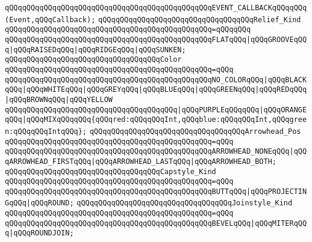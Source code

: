\verb|qQQqqQQqqQQqqQQqqQQqqQQqqQQqqQQqqQQqqQQqqQQqqQQqEVENT_CALLBACKqQQqqQQq(Event,qQQqCallback);|\newline
\newline
\verb|qQQqqQQqqQQqqQQqqQQqqQQqqQQqqQQqqQQqRelief_Kind|\newline
\verb|qQQqqQQqqQQqqQQqqQQqqQQqqQQqqQQqqQQqqQQqqQQqqQQq=qQQqqQQq|\newline
\verb|qQQqqQQqqQQqqQQqqQQqqQQqqQQqqQQqqQQqqQQqqQQqqQQqFLATqQQq|\verb#|qQQqGROOVEqQQq|qQQqRAISEDqQQq|qQQqRIDGEqQQq|qQQqSUNKEN;#\newline
\newline
\verb|qQQqqQQqqQQqqQQqqQQqqQQqqQQqqQQqqQQqColor|\newline
\verb|qQQqqQQqqQQqqQQqqQQqqQQqqQQqqQQqqQQqqQQqqQQqqQQq=qQQq|\newline
\verb|qQQqqQQqqQQqqQQqqQQqqQQqqQQqqQQqqQQqqQQqqQQqqQQqNO_COLORqQQq|\verb#|qQQqBLACKqQQq|qQQqWHITEqQQq|qQQqGREYqQQq|qQQqBLUEqQQq|qQQqGREENqQQq|qQQqREDqQQq|qQQqBROWNqQQq|qQQqYELLOW#\newline
\verb|qQQqqQQqqQQqqQQqqQQqqQQqqQQqqQQqqQQqqQQq|\verb#|qQQqPURPLEqQQqqQQq|qQQqORANGEqQQq|qQQqMIXqQQqqQQq{qQQqred:qQQqqQQqInt,qQQqblue:qQQqqQQqInt,qQQqgreen:qQQqqQQqIntqQQq};#\newline
\newline
\verb|qQQqqQQqqQQqqQQqqQQqqQQqqQQqqQQqqQQqArrowhead_Pos|\newline
\verb|qQQqqQQqqQQqqQQqqQQqqQQqqQQqqQQqqQQqqQQqqQQqqQQq=qQQq|\newline
\verb|qQQqqQQqqQQqqQQqqQQqqQQqqQQqqQQqqQQqqQQqqQQqqQQqARROWHEAD_NONEqQQq|\verb#|qQQqARROWHEAD_FIRSTqQQq|qQQqARROWHEAD_LASTqQQq|qQQqARROWHEAD_BOTH;#\newline
\newline
\verb|qQQqqQQqqQQqqQQqqQQqqQQqqQQqqQQqqQQqCapstyle_Kind|\newline
\verb|qQQqqQQqqQQqqQQqqQQqqQQqqQQqqQQqqQQqqQQqqQQqqQQq=qQQq|\newline
\verb|qQQqqQQqqQQqqQQqqQQqqQQqqQQqqQQqqQQqqQQqqQQqqQQqBUTTqQQq|\verb#|qQQqPROJECTINGqQQq|qQQqROUND;#\newline
\newline
\verb|qQQqqQQqqQQqqQQqqQQqqQQqqQQqqQQqqQQqJoinstyle_Kind|\newline
\verb|qQQqqQQqqQQqqQQqqQQqqQQqqQQqqQQqqQQqqQQqqQQqqQQq=qQQq|\newline
\verb|qQQqqQQqqQQqqQQqqQQqqQQqqQQqqQQqqQQqqQQqqQQqqQQqBEVELqQQq|\verb#|qQQqMITERqQQq|qQQqROUNDJOIN;#\newline
\newline
